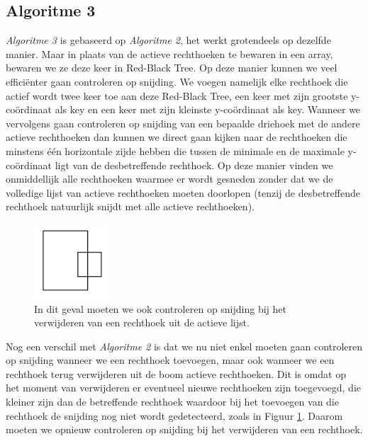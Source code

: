\documentclass[11pt,a4paper,titlepage]{article}
\begin{document}
	\subsection{Algoritme 3}
	\emph{Algoritme 3} is gebaseerd op \emph{Algoritme 2}, het werkt grotendeels op dezelfde manier. Maar in plaats van de actieve rechthoeken te bewaren in een array, bewaren we ze deze keer in Red-Black Tree. Op deze manier kunnen we veel efficiënter gaan controleren op snijding. We voegen namelijk elke rechthoek die actief wordt twee keer toe aan deze Red-Black Tree, een keer met zijn grootste y-coördinaat als key en een keer met zijn kleinste y-coördinaat als key.  Wanneer we vervolgens gaan controleren op snijding van een bepaalde driehoek met de andere actieve rechthoeken dan kunnen we direct gaan kijken naar de rechthoeken die minstens één horizontale zijde hebben die tussen de minimale en de maximale y-coördinaat ligt van de desbetreffende rechthoek. Op deze manier vinden we onmiddellijk alle rechthoeken waarmee er wordt gesneden zonder dat we de volledige lijst van actieve rechthoeken moeten doorlopen (tenzij de desbetreffende rechthoek natuurlijk snijdt met alle actieve rechthoeken). 
	\begin{figure}
		\centering
		\includegraphics[width=0.25\textwidth]{rechthoekenAlgo3}
		\caption{\label{rechthoekenAlgo3} In dit geval moeten we ook controleren op snijding bij het verwijderen van een rechthoek uit de actieve lijst.}
	\end{figure}
	Nog een verschil met \emph{Algoritme 2} is dat we nu niet enkel moeten gaan controleren op snijding wanneer we een rechthoek toevoegen, maar ook wanneer we een rechthoek terug verwijderen uit de boom actieve rechthoeken. Dit is omdat op het moment van verwijderen er eventueel nieuwe rechthoeken zijn toegevoegd, die kleiner zijn dan de betreffende rechthoek waardoor bij het toevoegen van die rechthoek de snijding nog niet wordt gedetecteerd, zoals in Figuur \ref{rechthoekenAlgo3}. Daarom moeten we opnieuw controleren op snijding bij het verwijderen van een rechthoek. \\
	
\end{document}
